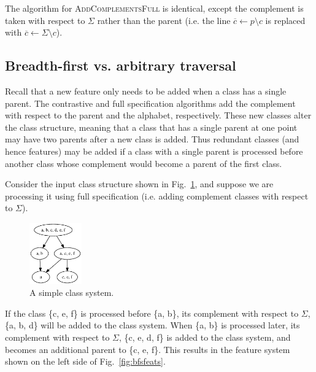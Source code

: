 \documentclass[11pt, oneside]{article}   	%
\begin{document}
\vspace{\baselineskip} \noindent The algorithm for \textsc{AddComplementsFull} is identical, except the complement is taken with respect to $\Sigma$ rather than the parent (i.e. the line $\overline{c} \leftarrow p \setminus c$ is replaced with $\overline{c} \leftarrow \Sigma \setminus c$).

\subsection{Breadth-first vs. arbitrary traversal}
\label{app:bfs}

Recall that a new feature only needs to be added when a class has a single parent. The contrastive and full specification algorithms add the complement with respect to the parent and the alphabet, respectively. These new classes alter the class structure, meaning that a class that has a single parent at one point may have two parents after a new class is added. Thus redundant classes (and hence features) may be added if a class with a single parent is processed before another class whose complement would become a parent of the first class.

Consider the input class structure shown in Fig.~\ref{fig:bfs1}, and suppose we are processing it using full specification (i.e. adding complement classes with respect to $\Sigma$). 

\begin{figure}[htb!]
	\centering
	\includegraphics[width=0.2\textwidth]{bfs1.png}
	\caption{A simple class system.}
	\label{fig:bfs1}
\end{figure}

If the class \{c, e, f\} is processed before \{a, b\}, its complement with respect to $\Sigma$, \{a, b, d\} will be added to the class system. When \{a, b\} is processed later, its complement with respect to $\Sigma$, \{c, e, d, f\} is added to the class system, and becomes an additional parent to \{c, e, f\}. This results in the feature system shown on the left side of Fig.~\ref{fig:bfsfeats}.
\end{document}
